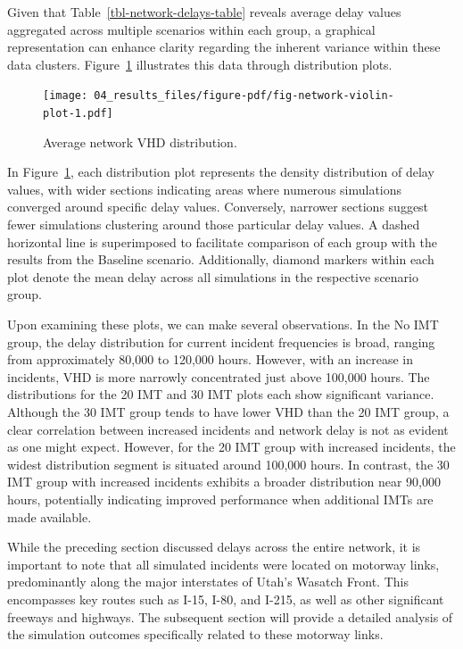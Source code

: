 \documentclass[fancy, oneside, mastersfancy, ms]{byuthesis}
\begin{document}
Given that Table~\ref{tbl-network-delays-table} reveals average delay
values aggregated across multiple scenarios within each group, a
graphical representation can enhance clarity regarding the inherent
variance within these data clusters.
Figure~\ref{fig-network-violin-plot} illustrates this data through
distribution plots.

\begin{figure}

{\centering \texttt{[image: 04\_results\_files/figure-pdf/fig-network-violin-plot-1.pdf]}

}

\caption{\label{fig-network-violin-plot}Average network VHD
distribution.}

\end{figure}

In Figure~\ref{fig-network-violin-plot}, each distribution plot
represents the density distribution of delay values, with wider sections
indicating areas where numerous simulations converged around specific
delay values. Conversely, narrower sections suggest fewer simulations
clustering around those particular delay values. A dashed horizontal
line is superimposed to facilitate comparison of each group with the
results from the Baseline scenario. Additionally, diamond markers within
each plot denote the mean delay across all simulations in the respective
scenario group.

Upon examining these plots, we can make several observations. In the No
IMT group, the delay distribution for current incident frequencies is
broad, ranging from approximately 80,000 to 120,000 hours. However, with
an increase in incidents, VHD is more narrowly concentrated just above
100,000 hours. The distributions for the 20 IMT and 30 IMT plots each
show significant variance. Although the 30 IMT group tends to have lower
VHD than the 20 IMT group, a clear correlation between increased
incidents and network delay is not as evident as one might expect.
However, for the 20 IMT group with increased incidents, the widest
distribution segment is situated around 100,000 hours. In contrast, the
30 IMT group with increased incidents exhibits a broader distribution
near 90,000 hours, potentially indicating improved performance when
additional IMTs are made available.

While the preceding section discussed delays across the entire network,
it is important to note that all simulated incidents were located on
motorway links, predominantly along the major interstates of Utah's
Wasatch Front. This encompasses key routes such as I-15, I-80, and
I-215, as well as other significant freeways and highways. The
subsequent section will provide a detailed analysis of the simulation
outcomes specifically related to these motorway links.
\end{document}
